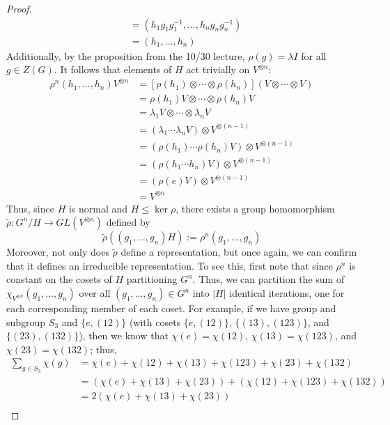 \documentclass[../psets.tex]{subfiles}
\begin{document}
\begin{enumerate}
\begin{proof}
\begin{align*}
            &= (h_1g_1g_1^{-1},\dots,h_ng_ng_n^{-1})\\
            &= (h_1,\dots,h_n)
        \end{align*}
        Additionally, by the proposition from the 10/30 lecture, $\rho(g)=\lambda I$ for all $g\in Z(G)$. It follows that elements of $H$ act trivially on $V^{\otimes n}$:
        \begin{align*}
            \rho^n(h_1,\dots,h_n)V^{\otimes n} &= [\rho(h_1)\otimes\cdots\otimes\rho(h_n)](V\otimes\cdots\otimes V)\\
            &= \rho(h_1)V\otimes\cdots\otimes\rho(h_n)V\\
            &= \lambda_1V\otimes\cdots\otimes\lambda_nV\\
            &= (\lambda_1\cdots\lambda_nV)\otimes V^{\otimes(n-1)}\\
            &= (\rho(h_1)\cdots\rho(h_n)V)\otimes V^{\otimes(n-1)}\\
            &= (\rho(h_1\cdots h_n)V)\otimes V^{\otimes(n-1)}\\
            &= (\rho(e)V)\otimes V^{\otimes(n-1)}\\
            &= V^{\otimes n}
        \end{align*}
        Thus, since $H$ is normal and $H\leq\ker\rho$, there exists a group homomorphism $\tilde{\rho}:G^n/H\to GL(V^{\otimes n})$ defined by
        \begin{equation*}
            \tilde{\rho}((g_1,\dots,g_n)H) := \rho^n(g_1,\dots,g_n)
        \end{equation*}
        Moreover, not only does $\tilde{\rho}$ define a representation, but once again, we can confirm that it defines an irreducible representation. To see this, first note that since $\rho^n$ is constant on the cosets of $H$ partitioning $G^n$. Thus, we can partition the sum of $\chi_{V^{\otimes n}}(g_1,\dots,g_n)$ over all $(g_1,\dots,g_n)\in G^n$ into $|H|$ identical iterations, one for each corresponding member of each coset. For example, if we have group and subgroup $S_3$ and $\{e,(12)\}$ (with cosets $\{e,(12)\}$, $\{(13),(123)\}$, and $\{(23),(132)\}$), then we know that $\chi(e)=\chi(12)$, $\chi(13)=\chi(123)$, and $\chi(23)=\chi(132)$; thus,
        \begin{align*}
            \sum_{g\in S_3}\chi(g) &= \chi(e)+\chi(12)+\chi(13)+\chi(123)+\chi(23)+\chi(132)\\
            &= (\chi(e)+\chi(13)+\chi(23))+(\chi(12)+\chi(123)+\chi(132))\\
            &= 2(\chi(e)+\chi(13)+\chi(23))\\

\end{align*}
\end{proof}
\end{enumerate}
\end{document}
